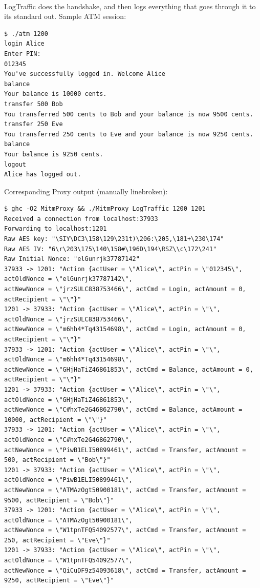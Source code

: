 \documentclass[12pt]{article}
\begin{document}
\\
LogTraffic does the handshake, and then logs everything that goes through it to its standard out.
Sample ATM session:
\begin{Verbatim}[frame=single,fontsize=\scriptsize]
$ ./atm 1200
login Alice
Enter PIN:
012345
You've successfully logged in. Welcome Alice
balance
Your balance is 10000 cents.
transfer 500 Bob
You transferred 500 cents to Bob and your balance is now 9500 cents.
transfer 250 Eve
You transferred 250 cents to Eve and your balance is now 9250 cents.
balance
Your balance is 9250 cents.
logout
Alice has logged out.
\end{Verbatim}
Corresponding Proxy output (manually linebroken):
\begin{Verbatim}[frame=single,fontsize=\scriptsize]
$ ghc -O2 MitmProxy && ./MitmProxy LogTraffic 1200 1201
Received a connection from localhost:37933
Forwarding to localhost:1201
Raw AES key: "\SIY\DC3\158\129\231t)\206:\205,\181+\230\174"
Raw AES IV: "6\r\203\175\140\158#\196D\194\RSZ\\c\172\241"
Raw Initial Nonce: "elGunrjk37787142"
37933 -> 1201: "Action {actUser = \"Alice\", actPin = \"012345\", actOldNonce = \"elGunrjk37787142\", 
actNewNonce = \"jrzSULC838753466\", actCmd = Login, actAmount = 0, actRecipient = \"\"}"
1201 -> 37933: "Action {actUser = \"Alice\", actPin = \"\", actOldNonce = \"jrzSULC838753466\", 
actNewNonce = \"m6hh4*Tq43154698\", actCmd = Login, actAmount = 0, actRecipient = \"\"}"
37933 -> 1201: "Action {actUser = \"Alice\", actPin = \"\", actOldNonce = \"m6hh4*Tq43154698\", 
actNewNonce = \"GHjHaTiZ46861853\", actCmd = Balance, actAmount = 0, actRecipient = \"\"}"
1201 -> 37933: "Action {actUser = \"Alice\", actPin = \"\", actOldNonce = \"GHjHaTiZ46861853\", 
actNewNonce = \"C#hxTe2G46862790\", actCmd = Balance, actAmount = 10000, actRecipient = \"\"}"
37933 -> 1201: "Action {actUser = \"Alice\", actPin = \"\", actOldNonce = \"C#hxTe2G46862790\", 
actNewNonce = \"PiwB1ELI50899461\", actCmd = Transfer, actAmount = 500, actRecipient = \"Bob\"}"
1201 -> 37933: "Action {actUser = \"Alice\", actPin = \"\", actOldNonce = \"PiwB1ELI50899461\", 
actNewNonce = \"ATMAzOgt50900181\", actCmd = Transfer, actAmount = 9500, actRecipient = \"Bob\"}"
37933 -> 1201: "Action {actUser = \"Alice\", actPin = \"\", actOldNonce = \"ATMAzOgt50900181\", 
actNewNonce = \"W1tpnTFQ54092577\", actCmd = Transfer, actAmount = 250, actRecipient = \"Eve\"}"
1201 -> 37933: "Action {actUser = \"Alice\", actPin = \"\", actOldNonce = \"W1tpnTFQ54092577\", 
actNewNonce = \"QiCuDF9z54093618\", actCmd = Transfer, actAmount = 9250, actRecipient = \"Eve\"}"

\end{Verbatim}
\end{document}
